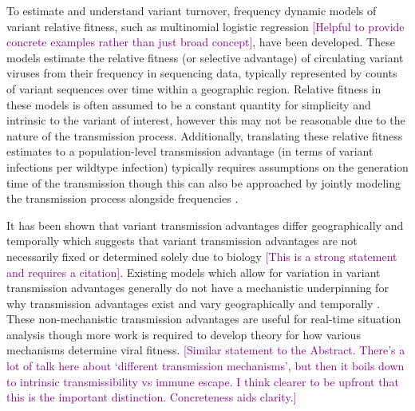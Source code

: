 \documentclass[12pt,oneside,letterpaper]{article}
\def\tbc#1{\textcolor{purple}{[#1]}}
\begin{document}
To estimate and understand variant turnover, frequency dynamic models of variant relative fitness, such as multinomial logistic regression \tbc{Helpful to provide concrete examples rather than just broad concept}, have been developed.
These models estimate the relative fitness (or selective advantage) of circulating variant viruses from their frequency in sequencing data, typically represented by counts of variant sequences over time within a geographic region.
Relative fitness in these models is often assumed to be a constant quantity for simplicity and intrinsic to the variant of interest, however this may not be reasonable due to the nature of the transmission process.
Additionally, translating these relative fitness estimates to a population-level transmission advantage (in terms of variant infections per wildtype infection) typically requires assumptions on the generation time of the transmission though this can also be approached by jointly modeling the transmission process alongside frequencies \cite{Wallinga2006, figgins2022sars}.

It has been shown that variant transmission advantages differ geographically and temporally which suggests that variant transmission advantages are not necessarily fixed or determined solely due to biology \tbc{This is a strong statement and requires a citation}.
Existing models which allow for variation in variant transmission advantages generally do not have a mechanistic underpinning for why transmission advantages exist and vary geographically and temporally \cite{figgins2022sars, susswein2023leveraging}.
These non-mechanistic transmission advantages are useful for real-time situation analysis though more work is required to develop theory for how various mechanisms determine viral fitness.
\tbc{Similar statement to the Abstract. There's a lot of talk here about `different transmission mechanisms', but then it boils down to intrinsic transmissibility vs immune escape. I think clearer to be upfront that this is the important distinction. Concreteness aids clarity.}
\end{document}
